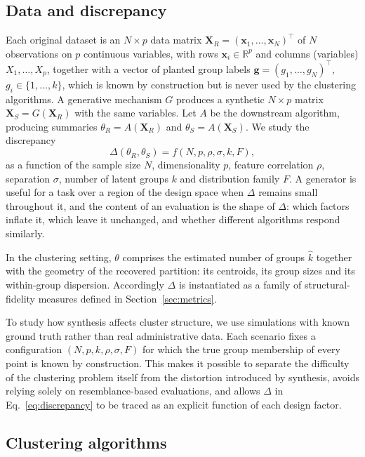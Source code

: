 \documentclass[pdflatex,referee]{sn-jnl}
\newcommand{\bx}{\mathbf{x}}
\newcommand{\bX}{\mathbf{X}}
\newcommand{\bg}{\mathbf{g}}
\begin{document}
\subsection{Data and discrepancy}

Each original dataset is an $N \times p$ data matrix
$\bX_R = (\bx_1,\dots,\bx_N)^{\top}$ of $N$ observations on $p$ continuous
variables, with rows $\bx_i \in \mathbb{R}^p$ and columns (variables)
$X_1,\dots,X_p$, together with a vector of planted group labels
$\bg = (g_1,\dots,g_N)^{\top}$, $g_i \in \{1,\dots,k\}$, which is known by
construction but is never used by the clustering algorithms. A generative
mechanism $G$ produces a synthetic $N \times p$ matrix $\bX_S = G(\bX_R)$ with
the same variables. Let $A$ be the downstream algorithm, producing summaries
$\theta_R = A(\bX_R)$ and $\theta_S = A(\bX_S)$. We study the discrepancy
\begin{equation}
  \Delta(\theta_R, \theta_S) = f(N, p, \rho, \sigma, k, F),
  \label{eq:discrepancy}
\end{equation}
as a function of the sample size $N$, dimensionality $p$, feature
correlation $\rho$, separation $\sigma$, number of latent groups $k$ and
distribution family $F$. A generator is useful for a task over a region of the
design space when $\Delta$ remains small throughout it, and the content of an
evaluation is the shape of $\Delta$: which factors inflate it, which leave it
unchanged, and whether different algorithms respond similarly.

In the clustering setting, $\theta$ comprises the estimated number of groups
$\hat{k}$ together with the geometry of the recovered partition: its
centroids, its group sizes and its within-group dispersion. Accordingly
$\Delta$ is instantiated as a family of structural-fidelity measures defined in
Section~\ref{sec:metrics}.

To study how synthesis affects cluster structure, we use simulations with
known ground truth rather than real administrative data. Each scenario fixes a
configuration $(N, p, k, \rho, \sigma, F)$ for which the true group membership
of every point is known by construction. This makes it possible to separate the
difficulty of the clustering problem itself from the distortion introduced by
synthesis, avoids relying solely on resemblance-based evaluations, and allows
$\Delta$ in Eq.~\eqref{eq:discrepancy} to be traced as an explicit function of
each design factor.

\subsection{Clustering algorithms}
\label{sec:algorithms}
\end{document}

